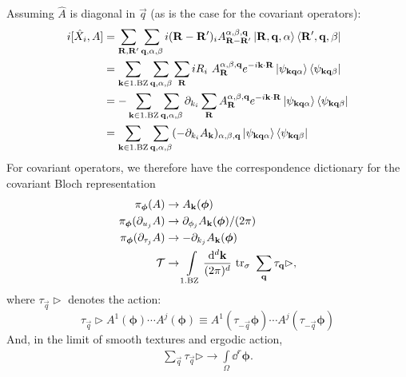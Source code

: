 \documentclass[
    aps,
    prb,
    twocolumn,
    floatfix,
    superscriptaddress,
	10pt
]{revtex4-2}
\begin{document}
Assuming $\hat{A}$ is diagonal in $\vec{q}$ (as is the case for the covariant operators):
\begin{align}
	i [ \hat{X}_i, A]
	& =  \sum_{\mathbf{R}, \mathbf{R}'} \sum_{\mathbf{q} , \alpha, \beta}
	i(\mathbf{R}-\mathbf{R}')_i A_{\mathbf{R}-\mathbf{R}'}^{ \alpha, \beta, \mathbf{q}} \ket{\mathbf{R}, \mathbf{q}, \alpha} \bra{\mathbf{R}',\mathbf{q}, \beta}
	\notag \\
	& =    \sum_{\mathbf{k} \in \mathrm{1. BZ}} \sum_{\mathbf{q} , \alpha, \beta}
	\sum_{\mathbf{R}}   i R_i~ A_{\mathbf{R}}^{ \alpha, \beta, \mathbf{q}} 
	e^{-i \mathbf{k}\cdot\mathbf{R}} 
	\ket{\psi_{\mathbf{k} \mathbf{q} \alpha}} \bra{\psi_{\mathbf{k} \mathbf{q} \beta}}
	\notag \\
	& =   -\sum_{\mathbf{k} \in \mathrm{1. BZ}} \sum_{\mathbf{q} , \alpha, \beta}\partial_{k_i}
	\sum_{\mathbf{R}}   A_{\mathbf{R}}^{ \alpha, \beta, \mathbf{q}} 
	e^{-i \mathbf{k}\cdot\mathbf{R}} 
	\ket{\psi_{\mathbf{k} \mathbf{q} \alpha}} \bra{\psi_{\mathbf{k} \mathbf{q} \beta}}
	\notag \\
	& =   \sum_{\mathbf{k} \in \mathrm{1. BZ}}\sum_{\mathbf{q} , \alpha, \beta}
	(-\partial_{k_i}A_{\mathbf{k}})_{ \alpha, \beta, \mathbf{q}}
	\ket{\psi_{\mathbf{k} \mathbf{q} \alpha}} \bra{\psi_{\mathbf{k} \mathbf{q} \beta}} 
\end{align}
For covariant operators, we therefore have the correspondence dictionary for the covariant Bloch representation
\begin{align}
	\pi_{\boldsymbol{\phi}}(A)
	& \to A_{\mathbf{k}}(\boldsymbol{\phi})
	\label{eq:rep1}
\\
	\pi_{\boldsymbol{\phi}}(\partial_{u_j} A)
	& 
	\to \partial_{\phi_j} A_{\mathbf{k}}(\boldsymbol{\phi}) / (2\pi)
	\label{eq:rep2}
	\\
	\pi_{\boldsymbol{\phi}}(\partial_{\tau_j} A)
	& 
	\to -\partial_{k_j} A_{\mathbf{k}}(\boldsymbol{\phi}) 
	\label{eq:rep3}
\\
 \mathcal{T} & \to  \int\limits_{\mathrm{1.BZ}} \frac{\mathrm{d}^d \mathbf{k}}{(2\pi)^d}~ \mathrm{tr}_\sigma ~ \sum_{\mathbf{q}}\tau_{\mathbf{q}} \rhd,
\end{align}
where $\tau_{\vec{q}} \rhd$ denotes the action: 
\begin{equation}
	\tau_{\vec{q}} \rhd A^1( \boldsymbol{\phi}) \cdots  A^j( \boldsymbol{\phi}) \equiv A^1( \tau_{-\vec{q}}\boldsymbol{\phi}) \cdots  A^j( \tau_{-\vec{q}}\boldsymbol{\phi})
\end{equation}
And, in the limit of smooth textures and ergodic action,
\begin{align}
	\sum_{\vec{q}}\tau_{\vec{q}} \rhd \to \int\limits_{\Omega }\dd^r \boldsymbol{\phi} .
\end{align}
\end{document}
